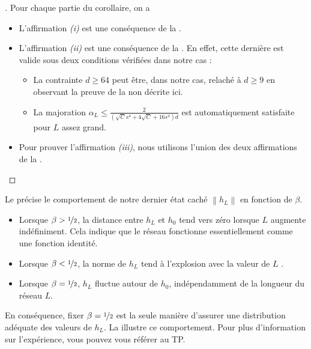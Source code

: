 \begin{proof}[]
    Pour chaque partie du corollaire, on a
    \begin{itemize}
        \item L'affirmation \textit{(i)} est une conséquence de la .
        \item L'affirmation \textit{(ii)} est une conséquence de la . En effet, cette dernière est valide sous deux conditions vérifiées dans notre cas : \begin{itemize}
            \item La contrainte $ d \geqslant 64 $ peut être, dans notre cas, relaché à $ d \geqslant 9 $ en observant la preuve de la  non décrite ici.
            \item La majoration $ \alpha _L \leqslant \frac{2}{(\sqrt{C} s^4 + 4 \sqrt{C} + 16s^4)d} $ est automatiquement satisfaite pour $ L $ assez grand.
        \end{itemize}
        \item Pour prouver l'affirmation \textit{(iii)}, nous utilisons l'union des deux affirmations de la .
    \end{itemize}
\end{proof}
Le  précise le comportement de notre dernier état caché $\left\| h_L \right\|$ en fonction de $\beta$.
\begin{itemize}
    \item Lorsque $\beta > \nicefrac{1}{2}$, la distance entre $h_L$ et $h_0$ tend vers zéro lorsque $L$ augmente indéfiniment. Cela indique que le réseau fonctionne essentiellement comme une fonction identité.
    \item Lorsque $\beta < \nicefrac{1}{2}$, la norme de $h_L$ tend à l'explosion avec la valeur de $ L $ .
    \item Lorsque $\beta = \nicefrac{1}{2}$, $h_L$ fluctue autour de $h_0$, indépendamment de la longueur du réseau $L$.
\end{itemize}
En conséquence, fixer $\beta = \nicefrac{1}{2}$ est la seule manière d'assurer une distribution adéquate des valeurs de $h_L$. La  illustre ce comportement. Pour plus d'information sur l'expérience, vous pouvez vous référer au TP.

